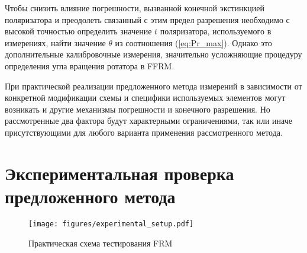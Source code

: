 \documentclass{article}
\begin{document}
Чтобы снизить влияние погрешности, вызванной конечной экстинкцией поляризатора и преодолеть связанный с этим предел разрешения необходимо с высокой точностью определить значение $t$ поляризатора, используемого в измерениях, найти значение $\theta$ из соотношения (\ref{eq:Pr_max}).
Однако это дополнительные калибровочные измерения, значительно усложняющие процедуру определения угла вращения ротатора в FFRM.

При практической реализации предложенного метода измерений в зависимости от конкретной модификации схемы и специфики используемых элементов могут возникать и другие механизмы погрешности и конечного разрешения.
Но рассмотренные два фактора будут характерными ограничениями, так или иначе присутствующими для любого варианта применения рассмотренного метода.   


\section{Экспериментальная проверка предложенного метода}
\begin{figure}[b]
	\centering
	\texttt{[image: figures/experimental\_setup.pdf]}
	\caption{Практическая схема тестирования FRM}
	\label{fig:experimantalScheme}
\end{figure}
\end{document}
